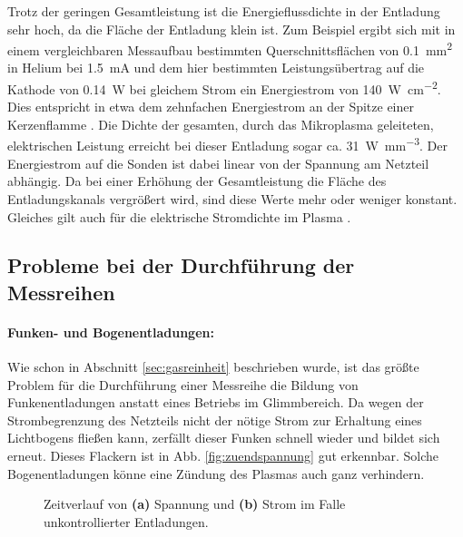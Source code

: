 Trotz der geringen Gesamtleistung ist die Energieflussdichte in der Entladung sehr hoch, da die Fläche der Entladung klein ist. Zum Beispiel ergibt sich mit in einem vergleichbaren Messaufbau bestimmten Querschnittsflächen von \qty{0,1}{\square\mm} in Helium bei \qty{1,5}{\mA} \cite{hansenConventionalNonconventionalDiagnostics2022} und dem hier bestimmten Leistungsübertrag auf die Kathode von \qty{0,14}{W} bei gleichem Strom ein Energie\-strom von \qty{140}{W.cm^{-2}}. Dies entspricht in etwa dem zehnfachen Energiestrom an der Spitze einer Kerzenflamme \cite{haminsCharacterizationCandleFlames2005}.
Die Dichte der gesamten, durch das Mikroplasma geleiteten, elektrischen Leistung erreicht bei dieser Entladung sogar ca. \qty{31}{W.mm^{-3}}. Der Energiestrom auf die Sonden ist dabei linear von der Spannung am Netzteil abhängig. Da bei einer Erhöhung der Gesamtleistung die Fläche des Entladungskanals vergrößert wird, sind diese Werte mehr oder weniger konstant. Gleiches gilt auch für die elektrische Stromdichte im Plasma \cite{hansenConventionalNonconventionalDiagnostics2022}.

\subsection{Probleme bei der Durchführung der Messreihen}\label{sec:probleme}
\paragraph{Funken- und Bogenentladungen: }
Wie schon in Abschnitt \ref{sec:gasreinheit} beschrieben wurde, ist das größte Problem für die Durchführung einer Messreihe die Bildung von Funkenentladungen anstatt eines Betriebs im Glimmbereich. Da wegen der Strombegrenzung des Netzteils nicht der nötige Strom zur Erhaltung eines Lichtbogens fließen kann, zerfällt dieser Funken schnell wieder und bildet sich erneut. Dieses Flackern ist in Abb. \ref{fig:zuendspannung} gut erkennbar. Solche Bogenentladungen könne eine Zündung des Plasmas auch ganz verhindern. 

\begin{figure}[h]
	\centering
	
	\caption{Zeitverlauf von \textbf{(a)} Spannung und \textbf{(b)} Strom im Falle unkontrollierter Entladungen.}
	\label{fig:arcing}
\end{figure}

